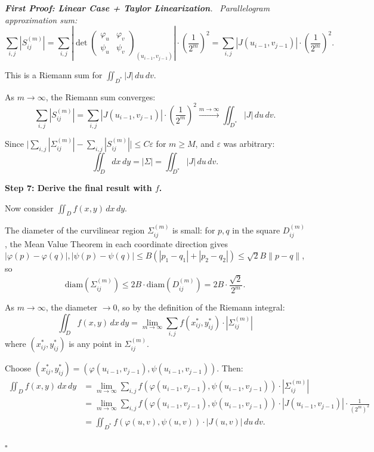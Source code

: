 \documentclass[11pt]{report}
\renewenvironment{proof}[1][Proof]{\par\noindent\textit{#1.}\ }{\hfill$\square$\par\medskip}
\begin{document}
\begin{proof}[\textbf{First Proof: Linear Case + Taylor Linearization}]
\textit{Parallelogram approximation sum:}
\[
\sum_{i,j} |S_{ij}^{(m)}| = \sum_{i,j} \left| \det \begin{pmatrix} \varphi_u & \varphi_v \\ \psi_u & \psi_v \end{pmatrix}_{(u_{i-1}, v_{j-1})} \right| \cdot \left( \frac{1}{2^m} \right)^2 = \sum_{i,j} |J(u_{i-1}, v_{j-1})| \cdot \left( \frac{1}{2^m} \right)^2.
\]

This is a Riemann sum for $\iint_{D^*} |J| \, du \, dv$.

As $m \to \infty$, the Riemann sum converges:
\[
\sum_{i,j} |S_{ij}^{(m)}| = \sum_{i,j} |J(u_{i-1}, v_{j-1})| \cdot \left( \frac{1}{2^m} \right)^2 \xrightarrow{m \to \infty} \iint_{D^*} |J| \, du \, dv.
\]

Since $\big| \sum_{i,j} |\Sigma_{ij}^{(m)}| - \sum_{i,j} |S_{ij}^{(m)}| \big| \leq C\varepsilon$ for $m \geq M$, and $\varepsilon$ was arbitrary:
\[
\iint_D dx \, dy = |\Sigma| = \iint_{D^*} |J| \, du \, dv.
\]

\textbf{Step 7: Derive the final result with $f$.}

Now consider $\iint_D f(x, y) \, dx \, dy$.

The diameter of the curvilinear region $\Sigma_{ij}^{(m)}$ is small: for $p, q$ in the square $D_{ij}^{(m)}$, the Mean Value Theorem in each coordinate direction gives $|\varphi(p) - \varphi(q)|, |\psi(p) - \psi(q)| \leq B(|p_1 - q_1| + |p_2 - q_2|) \leq \sqrt{2}B\|p - q\|$, so
\[
\text{diam}(\Sigma_{ij}^{(m)}) \leq 2B \cdot \text{diam}(D_{ij}^{(m)}) = 2B \cdot \frac{\sqrt{2}}{2^m}.
\]

As $m \to \infty$, the diameter $\to 0$, so by the definition of the Riemann integral:
\[
\iint_D f(x, y) \, dx \, dy = \lim_{m \to \infty} \sum_{i,j} f(x_{ij}^*, y_{ij}^*) \cdot |\Sigma_{ij}^{(m)}|
\]
where $(x_{ij}^*, y_{ij}^*)$ is any point in $\Sigma_{ij}^{(m)}$.

Choose $(x_{ij}^*, y_{ij}^*) = (\varphi(u_{i-1}, v_{j-1}), \psi(u_{i-1}, v_{j-1}))$. Then:
\begin{align*}
\iint_D f(x, y) \, dx \, dy &= \lim_{m \to \infty} \sum_{i,j} f(\varphi(u_{i-1}, v_{j-1}), \psi(u_{i-1}, v_{j-1})) \cdot |\Sigma_{ij}^{(m)}| \\
&= \lim_{m \to \infty} \sum_{i,j} f(\varphi(u_{i-1}, v_{j-1}), \psi(u_{i-1}, v_{j-1})) \cdot |J(u_{i-1}, v_{j-1})| \cdot \frac{1}{(2^m)^2} \\
&= \iint_{D^*} f(\varphi(u, v), \psi(u, v)) \cdot |J(u, v)| \, du \, dv.
\end{align*}


\end{proof}
\end{document}
